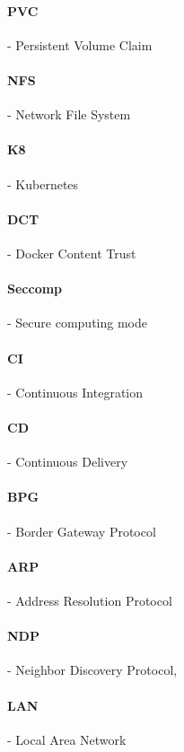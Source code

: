\paragraph{PVC} - Persistent Volume Claim

\paragraph{NFS} - Network File System

\paragraph{K8} - Kubernetes

\paragraph{DCT} - Docker Content Trust

\paragraph{Seccomp} - Secure computing mode

\paragraph{CI} - Continuous Integration

\paragraph{CD} - Continuous Delivery

\paragraph{BPG} - Border Gateway Protocol

\paragraph{ARP} - Address Resolution Protocol

\paragraph{NDP} - Neighbor Discovery Protocol,

\paragraph{LAN} - Local Area Network

